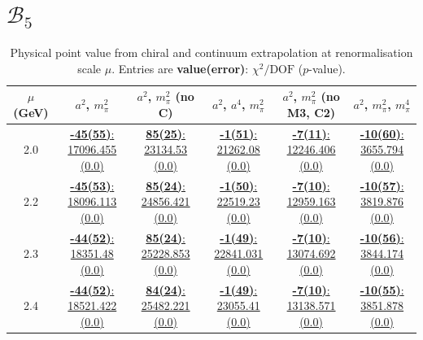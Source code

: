 \documentclass[12pt]{extarticle}
\begin{document}
\section{$\mathcal{B}_5$}
\begin{table}[h!]
\begin{center}
\begin{tabular}{|c|c|c|c|c|c|}
\hline
$\mu$ (GeV) & $a^2$, $m_\pi^2$& $a^2$, $m_\pi^2$ (no C)& $a^2$, $a^4$, $m_\pi^2$& $a^2$, $m_\pi^2$ (no M3, C2)& $a^2$, $m_\pi^2$, $m_\pi^4$\\
\hline
2.0& \hyperlink{TT/NPR/a2m2_20.pdf.1}{\textbf{-45(55)}: 17096.455 (0.0)} & \hyperlink{TT/NPR/a2m2noC_20.pdf.1}{\textbf{85(25)}: 23134.53 (0.0)} & \hyperlink{TT/NPR/a2a4m2_20.pdf.1}{\textbf{-1(51)}: 21262.08 (0.0)} & \hyperlink{TT/NPR/a2m2mcut_20.pdf.1}{\textbf{-7(11)}: 12246.406 (0.0)} & \hyperlink{TT/NPR/a2m2m4_20.pdf.1}{\textbf{-10(60)}: 3655.794 (0.0)}\\
2.2& \hyperlink{TT/NPR/a2m2_22.pdf.1}{\textbf{-45(53)}: 18096.113 (0.0)} & \hyperlink{TT/NPR/a2m2noC_22.pdf.1}{\textbf{85(24)}: 24856.421 (0.0)} & \hyperlink{TT/NPR/a2a4m2_22.pdf.1}{\textbf{-1(50)}: 22519.23 (0.0)} & \hyperlink{TT/NPR/a2m2mcut_22.pdf.1}{\textbf{-7(10)}: 12959.163 (0.0)} & \hyperlink{TT/NPR/a2m2m4_22.pdf.1}{\textbf{-10(57)}: 3819.876 (0.0)}\\
2.3& \hyperlink{TT/NPR/a2m2_23.pdf.1}{\textbf{-44(52)}: 18351.48 (0.0)} & \hyperlink{TT/NPR/a2m2noC_23.pdf.1}{\textbf{85(24)}: 25228.853 (0.0)} & \hyperlink{TT/NPR/a2a4m2_23.pdf.1}{\textbf{-1(49)}: 22841.031 (0.0)} & \hyperlink{TT/NPR/a2m2mcut_23.pdf.1}{\textbf{-7(10)}: 13074.692 (0.0)} & \hyperlink{TT/NPR/a2m2m4_23.pdf.1}{\textbf{-10(56)}: 3844.174 (0.0)}\\
2.4& \hyperlink{TT/NPR/a2m2_24.pdf.1}{\textbf{-44(52)}: 18521.422 (0.0)} & \hyperlink{TT/NPR/a2m2noC_24.pdf.1}{\textbf{84(24)}: 25482.221 (0.0)} & \hyperlink{TT/NPR/a2a4m2_24.pdf.1}{\textbf{-1(49)}: 23055.41 (0.0)} & \hyperlink{TT/NPR/a2m2mcut_24.pdf.1}{\textbf{-7(10)}: 13138.571 (0.0)} & \hyperlink{TT/NPR/a2m2m4_24.pdf.1}{\textbf{-10(55)}: 3851.878 (0.0)}\\
\hline
\end{tabular}
\caption{Physical point value from chiral and continuum extrapolation at renormalisation scale $\mu$. Entries are \textbf{value(error)}: $\chi^2/\text{DOF}$ ($p$-value).}
\end{center}
\end{table}
\end{document}
